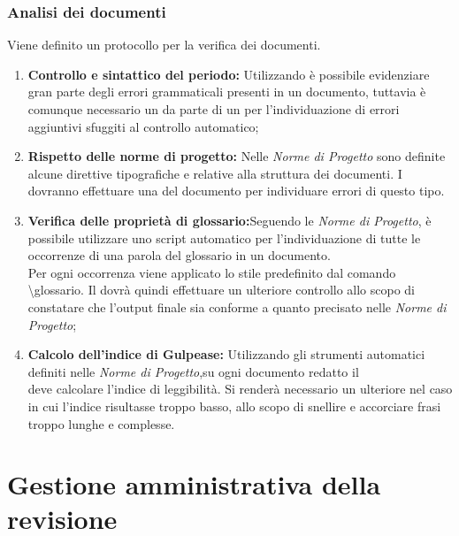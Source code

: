 \subsection{Analisi dei documenti}
Viene definito un protocollo per la verifica dei documenti.
\begin{enumerate}
	\item \textbf{Controllo e sintattico del periodo:} Utilizzando  è possibile evidenziare gran parte degli errori grammaticali presenti in un documento, tuttavia è comunque necessario un  da parte di un  per l'individuazione di errori aggiuntivi sfuggiti al controllo automatico;
	\item \textbf{Rispetto delle norme di progetto:} Nelle \textit{Norme di Progetto} sono definite alcune direttive tipografiche e relative alla struttura dei documenti.
	I  dovranno effettuare una  del documento per individuare errori di questo tipo.
	\item \textbf{Verifica delle proprietà di glossario:}Seguendo le \textit{Norme di Progetto}, è possibile utilizzare uno script automatico per l'individuazione di tutte le occorrenze di una parola del glossario in un documento.\\
	Per ogni occorrenza viene applicato lo stile  predefinito dal comando \textbackslash glossario.
	Il  dovrà quindi effettuare un ulteriore controllo allo scopo di constatare che l’output finale sia conforme a quanto precisato nelle \textit{Norme di Progetto};
	\item \textbf{Calcolo dell'indice di Gulpease:} Utilizzando gli strumenti automatici definiti nelle \textit{Norme di Progetto},su ogni documento redatto il \\  deve calcolare l’indice di leggibilità.
	Si renderà necessario un ulteriore  nel caso in cui l’indice risultasse troppo basso, allo scopo di snellire e accorciare frasi troppo lunghe e complesse.
\end{enumerate}


\chapter{Gestione amministrativa della revisione}
